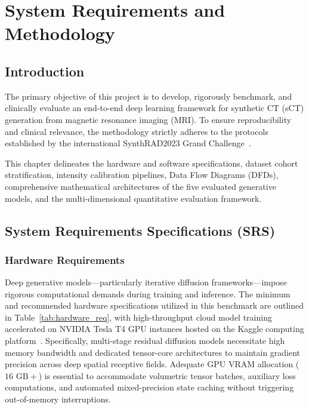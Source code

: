 \chapter{System Requirements and Methodology}

\section{Introduction}
The primary objective of this project is to develop, rigorously benchmark, and clinically evaluate an end-to-end deep learning framework for synthetic CT (sCT) generation from magnetic resonance imaging (MRI). To ensure reproducibility and clinical relevance, the methodology strictly adheres to the protocols established by the international SynthRAD2023 Grand Challenge~\cite{thummerer2023synthrad2023}. 

This chapter delineates the hardware and software specifications, dataset cohort stratification, intensity calibration pipelines, Data Flow Diagrams (DFDs), comprehensive mathematical architectures of the five evaluated generative models, and the multi-dimensional quantitative evaluation framework.

\section{System Requirements Specifications (SRS)}

\subsection{Hardware Requirements}
Deep generative models—particularly iterative diffusion frameworks—impose rigorous computational demands during training and inference. The minimum and recommended hardware specifications utilized in this benchmark are outlined in Table~\ref{tab:hardware_req}, with high-throughput cloud model training accelerated on NVIDIA Tesla T4 GPU instances hosted on the Kaggle computing platform~\cite{kaggle2024platform}. Specifically, multi-stage residual diffusion models necessitate high memory bandwidth and dedicated tensor-core architectures to maintain gradient precision across deep spatial receptive fields. Adequate GPU VRAM allocation ($16\text{ GB}+$) is essential to accommodate volumetric tensor batches, auxiliary loss computations, and automated mixed-precision state caching without triggering out-of-memory interruptions.

